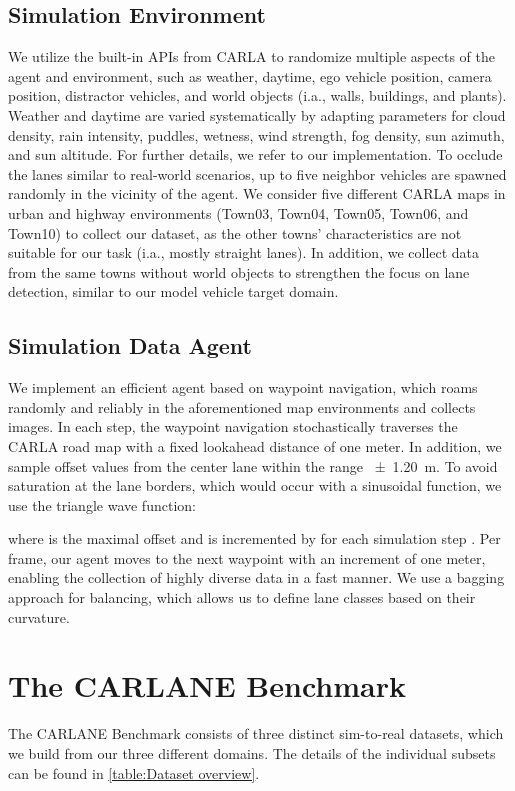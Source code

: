 \documentclass{article}
\begin{document}
	\subsection{Simulation Environment}
	We utilize the built-in APIs from CARLA to randomize multiple aspects of the agent and environment, such as weather, daytime, ego vehicle position, camera position, distractor vehicles, and world objects (i.a., walls, buildings, and plants). Weather and daytime are varied systematically by adapting parameters for cloud density, rain intensity, puddles, wetness, wind strength, fog density, sun azimuth, and sun altitude. For further details, we refer to our implementation. To occlude the lanes similar to real-world scenarios, up to five neighbor vehicles are spawned randomly in the vicinity of the agent. We consider five different CARLA maps in urban and highway environments (Town03, Town04, Town05, Town06, and Town10) to collect our dataset, as the other towns' characteristics are not suitable for our task (i.a., mostly straight lanes). In addition, we collect data from the same towns without world objects to strengthen the focus on lane detection, similar to our model vehicle target domain.
	
	\subsection{Simulation Data Agent}
	We implement an efficient agent based on waypoint navigation, which roams randomly and reliably in the aforementioned map environments and collects  images. In each step, the waypoint navigation stochastically traverses the CARLA road map with a fixed lookahead distance of one meter. 
	In addition, we sample offset values  from the center lane within the range \SI{\pm 1.20}{\metre}.
	To avoid saturation at the lane borders, which would occur with a sinusoidal function, we use the triangle wave function:
	
	where  is the maximal offset and  is incremented by  for each simulation step . Per frame, our agent moves to the next waypoint with an increment of one meter, enabling the collection of highly diverse data in a fast manner. We use a bagging approach for balancing, which allows us to define lane classes based on their curvature.
	
	\section{The CARLANE Benchmark}
	\label{sec:CARLANE}
	The CARLANE Benchmark consists of three distinct sim-to-real datasets, which we build from our three different domains. The details of the individual subsets can be found in \autoref{table:Dataset overview}.
	
\end{document}

